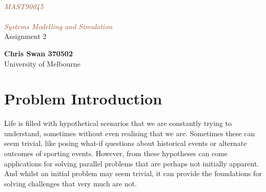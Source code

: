 \documentclass[a4paper, 11pt, oneside]{article}
\newcommand*{\plogo}{\fbox{$\mathcal{PL}$}} %
\begin{document}
\begin{center}  %
	
	
	\setlength{\unitlength}{0.6\textwidth} %
	
	{\color{LightGoldenrod}}\\[\baselineskip] %
	
	\textcolor{Sienna}{\textit{\Huge MAST90045\\ $\;$ \\Systems Modelling and Simulation}}\\[\baselineskip] %
	
	{\color{RosyBrown}\Large Assignment 2}\\ %
	
	{\color{LightGoldenrod}} %
	
	
	
	{\Large\textbf{Chris Swan 370502}}\\ %
	
	
	
	
	
	University of Melbourne %

\end{center}

\tableofcontents


\section{Problem Introduction}

Life is filled with hypothetical scenarios that we are constantly trying to understand, sometimes without even realising that we are. Sometimes these can seem trivial, like posing what-if questions about historical events or alternate outcomes of sporting events. However, from these hypotheses can come applications for solving parallel problems that are perhaps not initially apparent. And whilst an initial problem may seem trivial, it can provide the foundations for solving challenges that very much are not. \\
\end{document}

